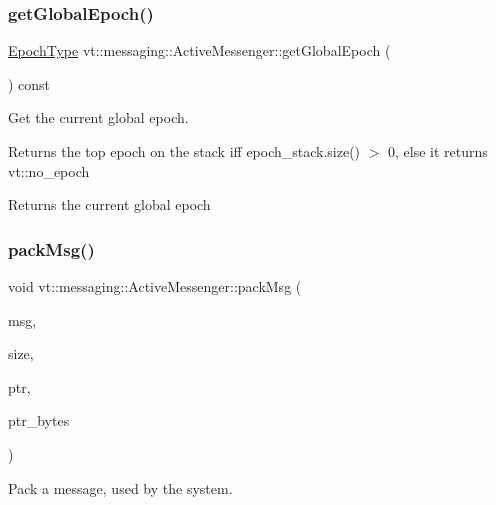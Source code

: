 \subsubsection{\texorpdfstring{get\+Global\+Epoch()}{getGlobalEpoch()}}
{\footnotesize\ttfamily \hyperlink{namespacevt_a985a5adf291c34a3ca263b3378388236}{Epoch\+Type} vt\+::messaging\+::\+Active\+Messenger\+::get\+Global\+Epoch (\begin{DoxyParamCaption}{ }\end{DoxyParamCaption}) const\hspace{0.3cm}{\ttfamily [inline]}}



Get the current global epoch. 

{\ttfamily Returns} the top epoch on the stack iff {\ttfamily epoch\+\_\+stack.\+size()} $>$ 0, else it returns {\ttfamily vt\+::no\+\_\+epoch} 

\begin{DoxyReturn}{Returns}
the current global epoch 
\end{DoxyReturn}
\mbox{\label{structvt_1_1messaging_1_1_active_messenger_af349201b71468a049f09ccad48ac359d}} 
\subsubsection{\texorpdfstring{pack\+Msg()}{packMsg()}}
{\footnotesize\ttfamily void vt\+::messaging\+::\+Active\+Messenger\+::pack\+Msg (\begin{DoxyParamCaption}\item[{\hyperlink{structvt_1_1messaging_1_1_active_messenger_a8a749506cb4813230f9bfeeac1b119c9}{Message\+Type} const}]{msg,  }\item[{\hyperlink{namespacevt_abfa009d900299ac1df967b40ea8f2c8a}{Msg\+Size\+Type} const \&}]{size,  }\item[{void $\ast$}]{ptr,  }\item[{\hyperlink{namespacevt_abfa009d900299ac1df967b40ea8f2c8a}{Msg\+Size\+Type} const \&}]{ptr\+\_\+bytes }\end{DoxyParamCaption})}



Pack a message, used by the system. 

